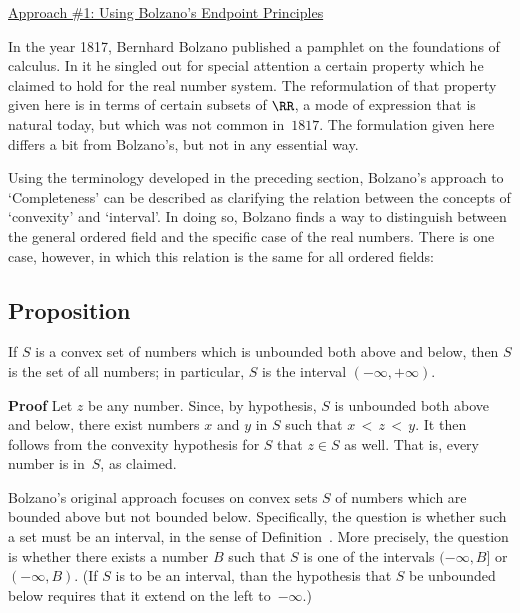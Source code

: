 \VV

        \underline{Approach \#1: Using Bolzano's Endpoint Principles}

\V

        In the year 1817, Bernhard Bolzano published a pamphlet on the foundations of calculus.
    In it he singled out for special attention a certain property which he claimed to hold for the real number system.
    The reformulation of that property given here is in terms of certain subsets of ${\RR}$,
    a mode of expression that is natural today, but which was not common in~$1817$.
    The formulation given here differs a bit from Bolzano's, but not in any essential way.

\VV

        Using the terminology developed in the preceding section, Bolzano's approach to `Completeness' can be described as
    clarifying the relation between the concepts of `convexity' and `interval'. In doing so,
    Bolzano finds a way to distinguish between the general ordered field and the specific case of the real numbers.
    There is one case, however, in which this relation is the same for all ordered fields:

\V

            \subsection{\small{\bf Proposition}}
            \label{PropB30.07A}
\V

        If $S$ is a convex set of numbers which is unbounded both above and below,
    then $S$ is the set of all numbers; in particular, $S$ is the interval $(-{\infty},+{\infty})$.

\V

        {\bf Proof} Let $z$ be any number. Since, by hypothesis, $S$ is unbounded both above and below,
    there exist numbers $x$ and $y$ in $S$ such that $x\,<\,z\,<\,y$. It then follows from the convexity hypothesis for $S$ that $z{\in}S$ as well.
    That is, every number is in~$S$, as claimed.

\VV

        Bolzano's original approach focuses on convex sets $S$ of numbers which are bounded above but not bounded below.
    Specifically, the question is whether such a set must be an interval, in the sense of Definition~.
    More precisely, the question is whether there exists a number $B$ such that $S$ is one of the intervals $(-{\infty},B]$ or $(-{\infty},B)$.
    (If $S$ is to be an interval, than the hypothesis that $S$ be unbounded below requires that it extend on the left to~$-{\infty}$.)

